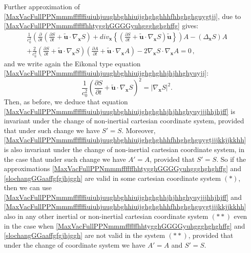\documentclass{article}
\theoremstyle{definition}
\theoremstyle{remark}
\renewcommand{\vec}[1]{\mathbf{#1}}
\newcommand{\er}{\eqref}
\newcommand{\er}{\eqref}
\begin{document}
%
%
%
Further approximation of
\er{MaxVacFullPPNmmmffffffiuiuhjuughbghhiuijghghghhhfhhghghguygtjj},
due to \er{MaxVacFullPPNmmmffffffhhtygghGGGGyuhggghghghffg} gives:
\begin{multline}\label{MaxVacFullPPNmmmffffffiuiuhjuughbghhiuijghghghhhfhhghghguygtjjjkkjjkkhh}
\frac{1}{c^2_0}\left(\frac{\partial}{\partial t}\left(\frac{\partial
S}{\partial t}+\vec {\tilde u}\cdot\nabla_{\vec x}S\right)+div_{\vec
x} \left\{\left(\frac{\partial S}{\partial t}+\vec {\tilde
u}\cdot\nabla_{\vec x} S\right)\vec {\tilde
u}\right\}\right)A-\left(\Delta_{\vec x}S\right)A
\\+\frac{2}{c^2_0}\left(\frac{\partial S}{\partial
t}+\vec {\tilde u}\cdot\nabla_{\vec x}S\right)\left(\frac{\partial
A}{\partial t}+\vec {\tilde u}\cdot\nabla_{\vec
x}A\right)
-2\nabla_{\vec x}S\cdot\nabla_{\vec x}A=0\,,
\end{multline}
and we write again the Eikonal type equation
\er{MaxVacFullPPNmmmffffffiuiuhjuughbghhiuijghghghhjhjhhghyuyjj}:
\begin{equation}\label{MaxVacFullPPNmmmffffffiuiuhjuughbghhiuijghghghhjhjhhghyuyjjjhhjhjff}
\frac{1}{c^2_0}\left(\frac{\partial S}{\partial t}+\vec {\tilde
u}\cdot\nabla_\vec x S\right)^2=\left|\nabla_\vec x S\right|^2.
\end{equation}
Then, as before, we deduce that equation
\er{MaxVacFullPPNmmmffffffiuiuhjuughbghhiuijghghghhjhjhhghyuyjjjhhjhjff}
is invariant under the change of non-inertial cartesian coordinate
system, provided that under such change we have $S'=S$. Moreover,
\er{MaxVacFullPPNmmmffffffiuiuhjuughbghhiuijghghghhhfhhghghguygtjjjkkjjkkhh}
is also invariant under the change of non-inertial cartesian
coordinate system, in the case that under such change we have
$A'=A$, provided that $S'=S$. So if the approximations
\er{MaxVacFullPPNmmmffffffhhtygghGGGGyuhggghghghffg} and
\er{slochangGGaaffgfgjhjggh} are valid in some cartesian coordinate
system $(*)$, then we can use
\er{MaxVacFullPPNmmmffffffiuiuhjuughbghhiuijghghghhjhjhhghyuyjjjhhjhjff}
and
\er{MaxVacFullPPNmmmffffffiuiuhjuughbghhiuijghghghhhfhhghghguygtjjjkkjjkkhh}
also in any other inertial or non-inertial cartesian coordinate
system $(**)$ even in the case when
\er{MaxVacFullPPNmmmffffffhhtygghGGGGyuhggghghghffg} and
\er{slochangGGaaffgfgjhjggh} are not valid in the system $(**)$,
provided that under the change of coordinate system we have $A'=A$
and $S'=S$.
\end{document}
